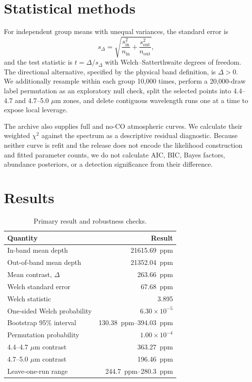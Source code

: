 \documentclass[11pt]{article}
\begin{document}
\section{Statistical methods}
For independent group means with unequal variances, the standard error is
\begin{equation}
  s_{\Delta}=\sqrt{\frac{s_{\mathrm{in}}^2}{n_{\mathrm{in}}}
  +\frac{s_{\mathrm{out}}^2}{n_{\mathrm{out}}}},
\end{equation}
and the test statistic is $t=\Delta/s_{\Delta}$ with Welch--Satterthwaite
degrees of freedom.  The directional alternative, specified by the physical
band definition, is $\Delta>0$.  We additionally resample within each group
10,000 times, perform a 20,000-draw label permutation as an exploratory null
check, split the selected points into 4.4--4.7 and 4.7--5.0 $\mu$m zones, and
delete contiguous wavelength runs one at a time to expose local leverage.

The archive also supplies full and no-CO atmospheric curves.  We calculate
their weighted $\chi^2$ against the spectrum as a descriptive residual
diagnostic.  Because neither curve is refit and the release does not encode
the likelihood construction and fitted parameter counts, we do not calculate
AIC, BIC, Bayes factors, abundance posteriors, or a detection significance
from their difference.

\section{Results}
\begin{table}[h]
\centering
\caption{Primary result and robustness checks.}
\begin{tabular}{lr}
\toprule
Quantity & Result \\
\midrule
In-band mean depth & \SI{21615.69}{ppm} \\
Out-of-band mean depth & \SI{21352.04}{ppm} \\
Mean contrast, $\Delta$ & \SI{263.66}{ppm} \\
Welch standard error & \SI{67.68}{ppm} \\
Welch statistic & 3.895 \\
One-sided Welch probability & $6.30\times10^{-5}$ \\
Bootstrap 95\% interval & \SIrange{130.38}{394.03}{ppm} \\
Permutation probability & $1.00\times10^{-4}$ \\
4.4--4.7 $\mu$m contrast & \SI{363.27}{ppm} \\
4.7--5.0 $\mu$m contrast & \SI{196.46}{ppm} \\
Leave-one-run range & \SIrange{244.7}{280.3}{ppm} \\
\bottomrule
\end{tabular}
\end{table}
\end{document}
